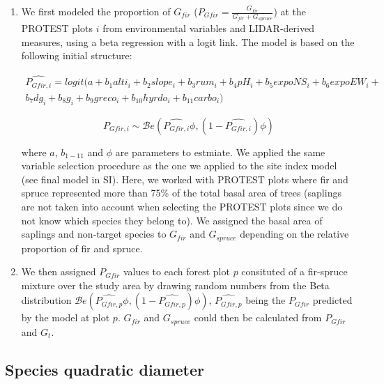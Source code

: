 \documentclass[a4paper]{article}
\begin{document}
\begin{enumerate}

  \item We first modeled the proportion of $G_{fir}$ ($P_{Gfir} = \frac{G_{fir}}{G_{fir} + G_{spruce}}$) at the PROTEST plots $i$ from environmental variables and LIDAR-derived measures, using a beta regression with a logit link. The model is based on the following initial structure:

  \begin{multline}\label{g}
    \widehat{P_{Gfir,i}} = logit(a + b_1 alti_i + b_2 slope_i + b_3 rum_i + b_4 pH_i + b_5 expoNS_i + b_6 expoEW_i + \\ b_7 dg_i + b_8 g_i + b_9 greco_i + b_{10} hyrdo_i + b_{11} carbo_i)
  \end{multline}

  \begin{equation}\label{gBeta}
    P_{Gfir,i} \sim \mathcal{B}e (\widehat{P_{Gfir,i}}\phi, (1-\widehat{P_{Gfir,i}})\phi)
  \end{equation}

  \noindent where $a$, $b_{1-11}$ and $\phi$ are parameters to estmiate. We applied the same variable selection procedure as the one we applied to the site index model (see final model in SI). Here, we worked with PROTEST plots where fir and spruce represented more than 75\% of the total basal area of trees (saplings are not taken into account when selecting the PROTEST plots since we do not know which species they belong to). We assigned the basal area of saplings and non-target species to $G_{fir}$ and $G_{spruce}$ depending on the relative proportion of fir and spruce.

  \item We then assigned $P_{Gfir}$ values to each forest plot $p$ consituted of a fir-spruce mixture over the study area by drawing random numbers from the Beta distribution $\mathcal{B}e (\widehat{P_{Gfir,p}}\phi, (1-\widehat{P_{Gfir,p}})\phi)$, $\widehat{P_{Gfir,p}}$ being the $P_{Gfir}$ predicted by the model at plot $p$. $G_{fir}$ and $G_{spruce}$ could then be calculated from $P_{Gfir}$ and $G_t$.

\end{enumerate}


\subsection*{Species quadratic diameter}\label{Dg}
\end{document}
